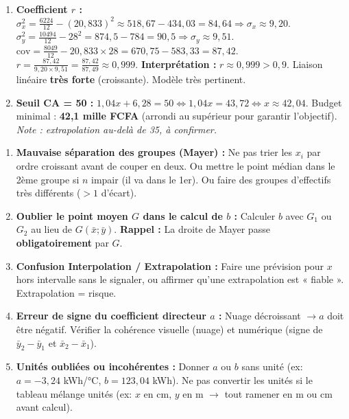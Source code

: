 \documentclass[11pt]{article}
\newcommand{\cle}[1]{{\popxbold\color{popdark}#1}}
\begin{document}
\begin{exoresolu}
\begin{enumerate}
    $x=50 \notin [5;35]$ (Extrapolation) : $y = 1,04 \times 50 + 6,28 = 58,28$ millions FCFA. \emph{Prévision peu fiable (saturation du marché probable).}
    \item \textbf{Coefficient $r$ :}
    $\sigma_x^2 = \frac{6224}{12} - (20,833)^2 \approx 518,67 - 434,03 = 84,64 \Rightarrow \sigma_x \approx 9,20$.
    $\sigma_y^2 = \frac{10494}{12} - 28^2 = 874,5 - 784 = 90,5 \Rightarrow \sigma_y \approx 9,51$.
    $\text{cov} = \frac{8049}{12} - 20,833 \times 28 = 670,75 - 583,33 = 87,42$.
    $r = \frac{87,42}{9,20 \times 9,51} = \frac{87,42}{87,49} \approx 0,999$.
    \textbf{Interprétation :} $r \approx 0,999 > 0,9$. Liaison linéaire \textbf{très forte} (croissante). Modèle très pertinent.
    \item \textbf{Seuil CA = 50 :} $1,04x + 6,28 = 50 \iff 1,04x = 43,72 \iff x \approx 42,04$.
    Budget minimal : \textbf{42,1 mille FCFA} (arrondi au supérieur pour garantir l'objectif). \emph{Note : extrapolation au-delà de 35, à confirmer.}
\end{enumerate}
\end{exoresolu}

\begin{attention}
\begin{enumerate}
    \item \textbf{Mauvaise séparation des groupes (Mayer) :} Ne pas trier les $x_i$ par ordre croissant avant de couper en deux. Ou mettre le point médian dans le 2ème groupe si $n$ impair (il va dans le 1er). Ou faire des groupes d'effectifs très différents ($>1$ d'écart).
    \item \textbf{Oublier le point moyen $G$ dans le calcul de $b$ :} Calculer $b$ avec $G_1$ ou $G_2$ au lieu de $G(\bar{x}; \bar{y})$. \textbf{Rappel :} La droite de Mayer passe \textbf{obligatoirement} par $G$.
    \item \textbf{Confusion Interpolation / Extrapolation :} Faire une prévision pour $x$ hors intervalle sans le signaler, ou affirmer qu'une extrapolation est « fiable ». \cle{Extrapolation = risque}.
    \item \textbf{Erreur de signe du coefficient directeur $a$ :} Nuage décroissant $\rightarrow a$ doit être négatif. Vérifier la cohérence visuelle (nuage) et numérique (signe de $\bar{y}_2-\bar{y}_1$ et $\bar{x}_2-\bar{x}_1$).
    \item \textbf{Unités oubliées ou incohérentes :} Donner $a$ ou $b$ sans unité (ex: $a = -3,24$ kWh/°C, $b = 123,04$ kWh). Ne pas convertir les unités si le tableau mélange unités (ex: $x$ en cm, $y$ en m $\rightarrow$ tout ramener en m ou cm avant calcul).
\end{enumerate}
\end{attention}
\end{document}
